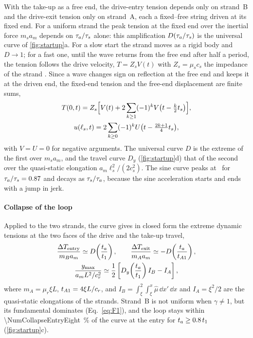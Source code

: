 With the take-up as a free end, the drive-entry tension depends only on strand~B and the
drive-exit tension only on strand~A, each a fixed--free string driven at its fixed end. For a
uniform strand the peak tension at the fixed end over the inertial force $m_sa_m$ depends on
$\tau_a/\tau_{s}$ alone: this amplification $D(\tau_a/\tau_{s})$ is the universal curve of
\cref{fig:startup}a. For a slow start the strand moves as a rigid body and $D\to1$; for a fast
one, until the wave returns from the free end after half a period, the tension follows the drive
velocity, $T=Z_sV(t)$ with $Z_s=\mu_sc_s$ the impedance of the strand
\citep[Art.~284]{love1906}. Since a wave changes sign on reflection at the free end and keeps
it at the driven end, the fixed-end tension and the free-end displacement are finite sums,
\begin{equation}\label{eq:dalembert}
\begin{gathered}
  T(0,t)=Z_s\Bigl[V(t)+2\sum_{k\ge1}(-1)^kV\bigl(t-\tfrac{k}{2}t_{s}\bigr)\Bigr],\\
  u(\ell_s,t)=2\sum_{k\ge0}(-1)^kU\bigl(t-\tfrac{2k+1}{4}t_{s}\bigr),
\end{gathered}
\end{equation}
with $V=U=0$ for negative arguments. The universal curve $D$ is the extreme of the first over
$m_sa_m$, and the travel curve $D_y$ (\cref{fig:startup}d) that of the second over the
quasi-static elongation $a_m\ell_s^2/(2c_s^2)$. The sine curve peaks at \NumStartPeakMax\ for
$\tau_a/\tau_{s}=0.87$ and decays as $\tau_{s}/\tau_a$, because the sine
acceleration starts and ends with a jump in jerk.

\paragraph{Collapse of the loop} Applied to the two strands, the curve gives in closed form
the extreme dynamic tensions at the two faces of the drive and the take-up travel,
\begin{equation}\label{eq:startup_formulas}
\begin{gathered}
  \frac{\Delta T_\mathrm{entry}}{m_Ba_m}\simeq D\!\left(\frac{t_a}{t_{1}}\right),\qquad
  \frac{\Delta T_\mathrm{exit}}{m_Aa_m}\simeq -D\!\left(\frac{t_a}{t_{A1}}\right),\\
  \frac{y_\mathrm{max}}{a_mL^2/c_r^2}\simeq\frac12\left[D_y\!\left(\frac{t_a}{t_{1}}\right)I_B-I_A\right],
\end{gathered}
\end{equation}
where $m_A=\mu_r\xi L$, $t_{A1}=4\xi L/c_r$, and $I_B=\int_\xi^2\int_\xi^x\hat\mu\,\dd x'\,\dd x$ and $I_A=\xi^2/2$ are the
quasi-static elongations of the strands. Strand~B is not uniform when $\gamma\ne1$, but its
fundamental dominates (Eq.~\eqref{eq:F1}), and the loop stays within
\qty{\NumCollapseEntryEight}{\percent} of the curve at the entry for $t_a\ge0.8\,t_{1}$
(\cref{fig:startup}c).

